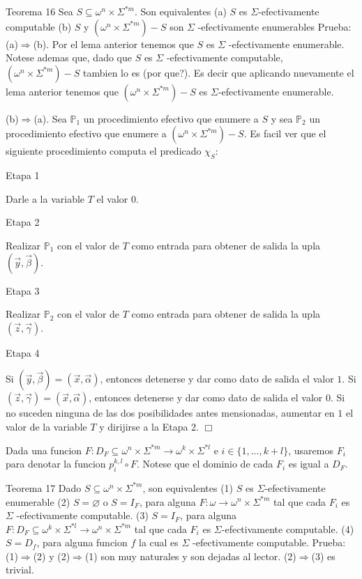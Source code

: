 Teorema 16 Sea \(S\subseteq \omega ^{n}\times \Sigma ^{\ast m}\). Son equivalentes
(a) \(S\) es \(\Sigma \)-efectivamente computable
(b) \(S\) y \((\omega ^{n}\times \Sigma ^{\ast m})-S\) son \(\Sigma \) -efectivamente enumerables
Prueba: (a)\(\Rightarrow \)(b). Por el lema anterior tenemos que \(S\) es \(\Sigma \) -efectivamente enumerable. Notese ademas que, dado que \(S\) es \(\Sigma \) -efectivamente computable, \((\omega ^{n}\times \Sigma ^{\ast m})-S\) tambien lo es (por que?). Es decir que aplicando nuevamente el lema anterior tenemos que \((\omega ^{n}\times \Sigma ^{\ast m})-S\) es \(\Sigma \)-efectivamente enumerable.

(b)\(\Rightarrow \)(a). Sea \(\mathbb{P}_{1}\) un procedimiento efectivo que enumere a \(S\) y sea \(\mathbb{P}_{2}\) un procedimiento efectivo que enumere a \((\omega ^{n}\times \Sigma ^{\ast m})-S\). Es facil ver que el siguiente procedimiento computa el predicado \(\chi _{S}\):

Etapa 1

Darle a la variable \(T\) el valor \(0\).

Etapa 2

Realizar \(\mathbb{P}_{1}\) con el valor de \(T\) como entrada para obtener de salida la upla \((\vec{y},\vec{\beta})\).

Etapa 3

Realizar \(\mathbb{P}_{2}\) con el valor de \(T\) como entrada para obtener de salida la upla \((\vec{z},\vec{\gamma})\).

Etapa 4

Si \((\vec{y},\vec{\beta})=(\vec{x},\vec{\alpha})\), entonces detenerse y dar como dato de salida el valor \(1\). Si \((\vec{z},\vec{\gamma} )=(\vec{x},\vec{\alpha})\), entonces detenerse y dar como dato de salida el valor \(0.\) Si no suceden ninguna de las dos posibilidades antes mensionadas, aumentar en \(1\) el valor de la variable \(T\) y dirijirse a la Etapa 2. \(\Box\)

Dada una funcion \(F:D_{F}\subseteq \omega ^{n}\times \Sigma ^{\ast m}\rightarrow \omega ^{k}\times \Sigma ^{\ast l}\) e \(i\in \{1,...,k+l\}\), usaremos \(F_{i}\) para denotar la funcion \(p_{i}^{k,l}\circ F.\) Notese que el dominio de cada \(F_{i}\) es igual a \(D_{F}.\)

Teorema 17 Dado \(S\subseteq \omega ^{n}\times \Sigma ^{\ast m}\), son equivalentes
(1) \(S\) es \(\Sigma \)-efectivamente enumerable
(2) \(S=\varnothing \) o \(S=I_{F}\), para alguna \(F:\omega \rightarrow \omega ^{n}\times \Sigma ^{\ast m}\) tal que cada \(F_{i}\) es \(\Sigma \) -efectivamente computable.
(3) \(S=I_{F}\), para alguna \(F:D_{F}\subseteq \omega ^{k}\times \Sigma ^{\ast l}\rightarrow \omega ^{n}\times \Sigma ^{\ast m}\) tal que cada \(F_{i}\) es \(\Sigma \)-efectivamente computable.
(4) \(S=D_{f}\), para alguna funcion \(f\) la cual es \(\Sigma \) -efectivamente computable.
Prueba: (1)\(\Rightarrow \)(2) y (2)\(\Rightarrow \)(1) son muy naturales y son dejadas al lector. (2)\(\Rightarrow \)(3) es trivial.

